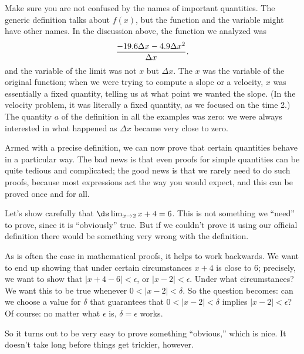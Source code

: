 Make sure you are not confused by the names of important
quantities. The generic definition talks about $f(x)$, but the
function and the variable might have other names. In the discussion
above, the function we analyzed was 
$${-19.6\Delta x-4.9\Delta x^2\over \Delta x}.
$$
and the variable of the limit was not $x$ but $\Delta x$. The $x$ was
the variable of the original function; when we were trying to compute
a slope or a velocity, $x$ was essentially a fixed quantity, telling us
at what point we wanted the slope. (In the velocity problem, it was
literally a fixed quantity, as we focused on the time 2.) The quantity
$a$ of the definition in all the examples was zero: we were always
interested in what happened as $\Delta x$ became very close to zero.

Armed with a precise definition, we can now prove that certain
quantities behave in a particular way. The bad news is that even
proofs for simple quantities can be quite tedious and complicated; the
good news is that we rarely need to do such proofs, because most
expressions act the way you would expect, and this can be proved once
and for all.

\exam\relax
\label{exam:epsilon-delta proof}
Let's show carefully that $\ds \lim_{x\to 2} x+4 = 6$. This is not
something we ``need'' to prove, since it is ``obviously'' true. But if
we couldn't prove it using our official definition there would be
something very wrong with the definition.

As is often the case in mathematical proofs, it helps to work
backwards. We want to end up showing that under certain circumstances
$x+4$ is close to 6; precisely, we want to show that
$|x+4-6|<\epsilon$,
or $|x-2|<\epsilon$. Under what circumstances? We want this to be true
whenever $0<|x-2|<\delta$. So the question becomes: can we choose a
value for $\delta$ that guarantees that $0<|x-2|<\delta$ implies
$|x-2|<\epsilon$? Of course: no matter what $\epsilon$ is,
$\delta=\epsilon$ works.

So it turns out to be very easy to prove something ``obvious,'' which
is nice. It doesn't take long before things get trickier, however.

